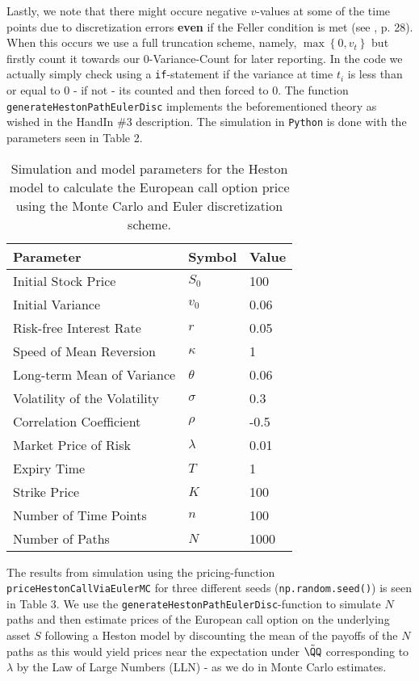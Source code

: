 \documentclass[11pt]{article}
\numberwithin{equation}{section}
\newcommand{\lc}{\left\{}
\newcommand{\rc}{\right\}}
\begin{document}
Lastly, we note that there might occure negative $v$-values at some of the time
points due to discretization errors \textbf{even} if the Feller condition is met (see
\cite{Havrylenko2024}, p. 28). When this occurs we use a full truncation
scheme, namely, $\max\lc 0,v_t\rc$ but firstly count it towards
our 0-Variance-Count for later reporting. In the code we actually simply
check using a \texttt{if}-statement if the variance at time $t_i$ is less than
or equal to $0$ - if not - its counted and then forced to 0.
The function \texttt{generateHestonPathEulerDisc} implements the beforementioned
theory as wished in the HandIn \#3 description.
\newpage
The simulation in \texttt{Python} is done with the parameters seen in Table 2.
\begin{table}[!h]
    \centering
    \begin{tabular}{lll}
    \toprule
    \textbf{Parameter} & \textbf{Symbol} & \textbf{Value} \\
    \midrule
    Initial Stock Price & $S_0$ & 100 \\
    Initial Variance & $v_0$ & 0.06 \\
    Risk-free Interest Rate & $r$ & 0.05 \\
    Speed of Mean Reversion & $\kappa$ & 1 \\
    Long-term Mean of Variance & $\theta$ & 0.06 \\
    Volatility of the Volatility & $\sigma$ & 0.3 \\
    Correlation Coefficient & $\rho$ & -0.5 \\
    Market Price of Risk & $\lambda$ & 0.01 \\
    Expiry Time & $T$ & 1 \\
    Strike Price & $K$ & 100 \\
    Number of Time Points & $n$ & 100 \\
    Number of Paths & $N$ & 1000 \\
    \bottomrule
    \end{tabular}
    \caption{Simulation and model parameters for the Heston model to calculate the European call option price using the Monte Carlo and Euler discretization scheme.}
    \label{table:call_option_pricing_parameters1}
    \end{table}

The results from simulation using the pricing-function \texttt{priceHestonCallViaEulerMC} for three different seeds
(\texttt{np.random.seed()}) is seen in Table 3. We use the
\texttt{generateHestonPathEulerDisc}-function to simulate $N$ paths and then
estimate prices of the European call option on the underlying asset $S$
following a Heston model by discounting the mean of the payoffs of the $N$ paths as this would
yield prices near the expectation under $\tilde{\QQ}$ corresponding to $\lambda$
by the Law of Large
Numbers (LLN) - as we do in Monte Carlo estimates.
\end{document}
